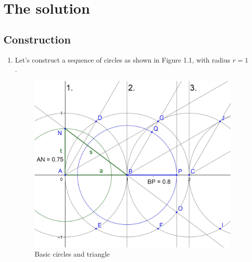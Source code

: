 \documentclass[12pt, letterpaper, oneside]{report}
\begin{document}
\tableofcontents


\chapter{The solution}

\section{Construction}
\begin{enumerate}
	\item Let's construct a sequence of circles as shown in Figure 1.1, with radius $r=1$.
\begin{figure}[H]
	\centerline{\includegraphics[scale=0.2]{secnd.jpg}}
	\caption{Basic circles and triangle}
	\label{fig:basic}
\end{figure}
	

\end{enumerate}
\end{document}
